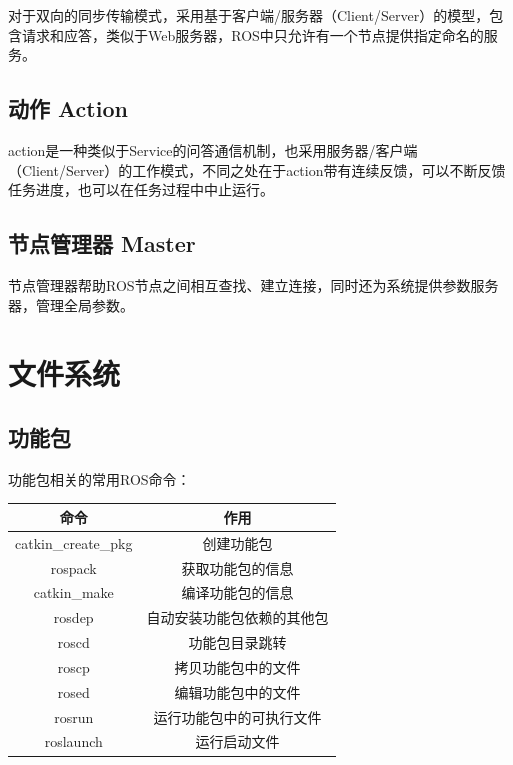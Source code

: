 \documentclass[9pt, oneside]{book}
\begin{document}
对于双向的同步传输模式，采用基于客户端/服务器（Client/Server）的模型，包含请求和应答，类似于Web服务器，ROS中只允许有一个节点提供指定命名的服务。

\subsection{动作 Action}

action是一种类似于Service的问答通信机制，也采用服务器/客户端（Client/Server）的工作模式，不同之处在于action带有连续反馈，可以不断反馈任务进度，也可以在任务过程中中止运行。

\subsection{节点管理器 Master}

节点管理器帮助ROS节点之间相互查找、建立连接，同时还为系统提供参数服务器，管理全局参数。

\section{文件系统}

\subsection{功能包}

功能包相关的常用ROS命令：

\begin{table}[H]
    \centering
    \begin{tabular}{c|c}
    \hline
    命令                  & 作用            \\ \hline
    catkin\_create\_pkg & 创建功能包         \\
    rospack             & 获取功能包的信息      \\
    catkin\_make        & 编译功能包的信息      \\
    rosdep              & 自动安装功能包依赖的其他包 \\
    roscd               & 功能包目录跳转       \\
    roscp               & 拷贝功能包中的文件     \\
    rosed               & 编辑功能包中的文件     \\
    rosrun              & 运行功能包中的可执行文件  \\
    roslaunch           & 运行启动文件        \\ \hline
    \end{tabular}
\end{table}
\end{document}
